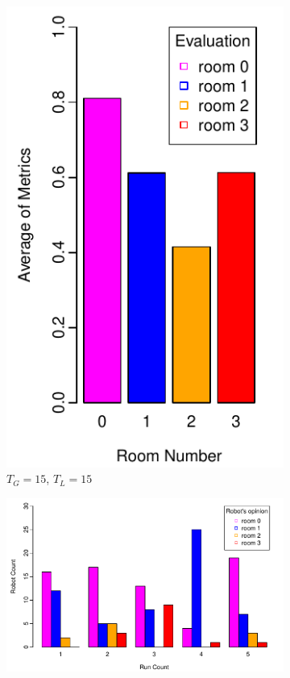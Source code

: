 \documentclass{llncs}
\begin{document}
\begin{figure}[h!]
        \begin{subfigure}[b]{0.25\textwidth}
                \includegraphics[width=\textwidth]{PLOT/EVAL/eval6}
                \caption{$T_G = 15$, $T_L = 15$}
                \label{fig:eval1}
        \end{subfigure}%
        \qquad
        \begin{subfigure}[b]{0.67\textwidth}
                \includegraphics[width=\textwidth]{PLOT/EXP/exp6}

\end{subfigure}
\end{figure}
\end{document}
